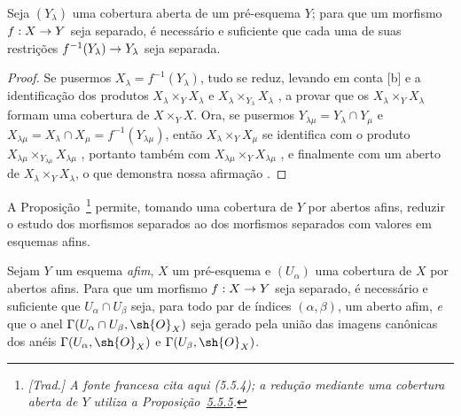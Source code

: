 \documentclass[oneside]{amsart}
\makeatletter
\newcommand{\ega@arrow}[2]{\mathchoice{#1}{#2}{#2}{#2}}
\renewcommand{\to}{\ega@arrow{\longrightarrow}{\rightarrow}}
\newcommand{\oldpage}[2][]{{\marginnote{\normalfont\textbf{#1}~|~#2}}\ignorespaces}
\let\EGAOriginalLabel\label
\renewcommand{\label}[1]{\phantomsection\EGAOriginalLabel{#1}}
\makeatother
\begin{document}
\oldpage[I]{138}

\begin{proposition}[5.5.5]
\label{I.5.5.5}
Seja $(Y_\lambda)$ uma cobertura aberta de um pré-esquema $Y$; para que um
morfismo $f:X\to Y$ seja separado, é necessário e suficiente que cada uma de
suas restrições $f^{-1}(Y_\lambda)\to Y_\lambda$ seja separada.
\end{proposition}

\begin{proof}
Se pusermos $X_\lambda=f^{-1}(Y_\lambda)$, tudo se reduz, levando em conta
[b] e a identificação dos produtos
$X_\lambda\times_Y X_\lambda$ e
$X_\lambda\times_{Y_\lambda}X_\lambda$ , a provar que os
$X_\lambda\times_Y X_\lambda$ formam uma cobertura de $X\times_Y X$.
Ora, se pusermos $Y_{\lambda\mu}=Y_\lambda\cap Y_\mu$ e
$X_{\lambda\mu}=X_\lambda\cap X_\mu=f^{-1}(Y_{\lambda\mu})$, então
$X_\lambda\times_Y X_\mu$ se identifica com o produto
$X_{\lambda\mu}\times_{Y_{\lambda\mu}}X_{\lambda\mu}$
, portanto também com
$X_{\lambda\mu}\times_Y X_{\lambda\mu}$ , e finalmente com um
aberto de $X_\lambda\times_Y X_\lambda$, o que demonstra nossa afirmação
.
\end{proof}

A Proposição~\footnote{\emph{[Trad.] A fonte francesa cita
aqui (5.5.4); a redução mediante uma cobertura aberta de $Y$ utiliza a
Proposição~\hyperref[I.5.5.5]{5.5.5}.}} permite, tomando uma cobertura de
$Y$ por abertos afins, reduzir o estudo dos morfismos separados ao dos
morfismos separados com valores em esquemas afins.

\begin{proposition}[5.5.6]
\label{I.5.5.6}
Sejam $Y$ um esquema \emph{afim}, $X$ um pré-esquema e $(U_\alpha)$ uma
cobertura de $X$ por abertos afins.
Para que um morfismo $f:X\to Y$ seja separado, é necessário e suficiente que
$U_\alpha\cap U_\beta$ seja, para todo par de índices $(\alpha,\beta)$, um
aberto afim, \emph{e} que o anel
$\Gamma(U_\alpha\cap U_\beta,\sh{O}_X)$ seja gerado pela união das imagens
canônicas dos anéis $\Gamma(U_\alpha,\sh{O}_X)$ e
$\Gamma(U_\beta,\sh{O}_X)$.
\end{proposition}
\end{document}

